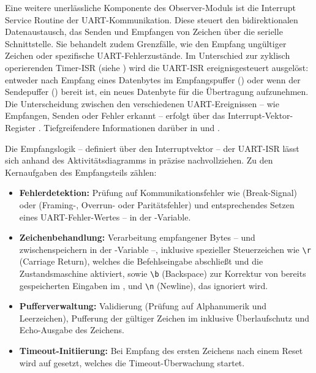 Eine weitere unerl\"assliche Komponente des Observer-Moduls ist die Interrupt Service Routine der UART-Kommunikation. Diese steuert den bidirektionalen Datenaustausch, \dahe das Senden und Empfangen von Zeichen \"uber die serielle Schnittstelle. Sie behandelt zudem Grenzf\"alle, wie den Empfang ung\"ultiger Zeichen oder spezifische UART-Fehlerzust\"ande. Im Unterschied zur zyklisch operierenden Timer-ISR (siehe ) wird die UART-ISR ereignisgesteuert ausgel\"ost: entweder nach Empfang eines Datenbytes im Empfangspuffer () oder wenn der Sendepuffer () bereit ist, ein neues Datenbyte f\"ur die \"Ubertragung aufzunehmen. Die Unterscheidung zwischen den verschiedenen UART-Ereignissen -- wie \zB Empfangen, Senden oder Fehler erkannt -- erfolgt \"uber das Interrupt-Vektor-Register . Tiefgreifendere Informationen dar\"uber in  und .

Die Empfangslogik -- definiert \"uber den Interruptvektor  -- der UART-ISR l\"asst sich anhand des Aktivit\"atsdiagramms in  pr\"azise nachvollziehen. Zu den Kernaufgaben des Empfangsteils z\"ahlen:

\begin{itemize}
	\item \textbf{Fehlerdetektion:} Pr\"ufung auf Kommunikationsfehler wie  (Break-Signal) oder  (Framing-, Overrun- oder Parit\"atsfehler) und entsprechendes Setzen eines UART-Fehler-Wertes -- in der -Variable. 
	
	\item \textbf{Zeichenbehandlung:} Verarbeitung empfangener Bytes -- und zwischenspeichern in der -Variable --, inklusive spezieller Steuerzeichen wie \glqq{}\texttt{\textbackslash r}\grqq{} (Carriage Return), welches die Befehlseingabe abschlie{\ss}t und die Zustandsmaschine aktiviert, sowie \glqq{}\texttt{\textbackslash b}\grqq{} (Backspace) zur Korrektur von bereits gespeicherten Eingaben im , und \glqq{}\texttt{\textbackslash n}\grqq{} (Newline), das ignoriert wird.

	\item \textbf{Pufferverwaltung:} Validierung (Pr\"ufung auf Alphanumerik und Leerzeichen), Pufferung der g\"ultiger Zeichen im  inklusive \"Uberlaufschutz und Echo-Ausgabe des Zeichens.

	\item \textbf{Timeout-Initiierung:} Bei Empfang des ersten Zeichens nach einem Reset wird  auf  gesetzt, welches die Timeout-\"Uberwachung startet.
\end{itemize}

